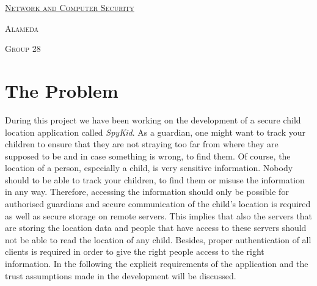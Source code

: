 \documentclass[a4paper]{article}
\begin{document}
\begin{titlepage}

    \begin{center}
        \begin{minipage}{0.75\linewidth}
            \centering
            \vspace{1.5cm}
            \href{https://fenix.tecnico.ulisboa.pt/disciplinas/SIRS7/2019-2020/1-semestre}
            {\scshape\LARGE Network and Computer Security} \par
            \vspace{1cm}
            {\scshape\Large Alameda} \par
            \vspace{1cm}
            {\scshape\Large Group 28} \par
            \vspace{1.5cm}

            \maketitle
        \end{minipage}
    \end{center}

\end{titlepage}

\tableofcontents
\thispagestyle{empty}
\newpage
\setcounter{page}{1}

\pagebreak

\section{The Problem}
During this project we have been working on the development of a secure child location application called \emph{SpyKid}. As a guardian, one might want to track your children to ensure that they are not straying too far from where they are supposed to be and in case something is wrong, to find them. Of course, the location of a person, especially a child, is very sensitive information. Nobody should to be able to track your children, to find them or misuse the information in any way. Therefore, accessing the information should only be possible for authorised guardians and secure communication of the child's location is required as well as secure storage on remote servers. This implies that also the servers that are storing the location data and people that have access to these servers should not be able to read the location of any child. Besides, proper authentication of all clients is required in order to give the right people access to the right information. In the following the explicit requirements of the application and the trust assumptions made in the development will be discussed.
\end{document}
